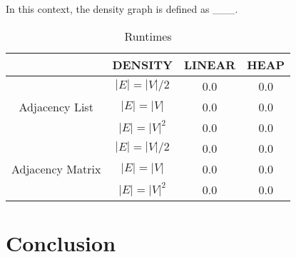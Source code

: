 \documentclass[technote]{IEEEtran}
\begin{document}
In this context, the density graph is defined as \_\_\_. 


\lipsum[1-2]

\begin{table}[!ht]
    \caption{Runtimes}
    \centering
    \begin{tabular}{|c|c|c|c|}
        \hline
        & DENSITY & LINEAR & HEAP \\ \hline
        \multirow{3}{*}{Adjacency List} 
        & $|E| = |V|/2$ & 0.0 & 0.0 \\ [0.5ex]\cline{2-4}
        & $|E| = |V|$ & 0.0 & 0.0 \\ \cline{2-4}
        & $|E| = |V|^2$ & 0.0 & 0.0 \\ \hline
        \multirow{3}{*}{Adjacency Matrix}
        & $|E| = |V|/2$ & 0.0 & 0.0 \\ \cline{2-4}
        & $|E| = |V|$ & 0.0 & 0.0 \\ \cline{2-4}
        & $|E| = |V|^2$ & 0.0 & 0.0 \\ \hline
    \end{tabular}
\end{table}

\section{Conclusion}
\lipsum[1-2]
\nocite{*}


\end{document}
